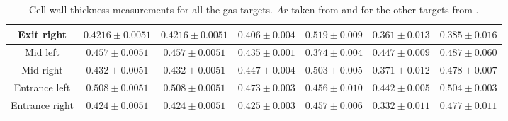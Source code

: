 \documentclass[final,5p,times,twocolumn]{elsarticle}
\begin{document}
\begin{table}[h!]
\begin{adjustbox}{width=1\textwidth}
\begin{tabular}{|c|c|c|c|c|c|c|}
Exit right              &      $0.4216 \pm 0.0051$                                                       & $0.4216 \pm 0.0051$                                                 & $0.406 \pm 0.004$                                                     & $0.519 \pm 0.009$                                                     & $0.361 \pm 0.013$                                                     & $0.385 \pm 0.016$                                                      \\ \hline
Mid left             &        $0.457 \pm 0.0051$                                                         & $0.457 \pm 0.0051$                                                  & $0.435 \pm 0.001$                                                     & $0.374 \pm 0.004$                                                     & $0.447 \pm 0.009$                                                     & $0.487 \pm 0.060$                                                      \\ \hline
Mid right             &       $0.432 \pm 0.0051$                                                         & $0.432 \pm 0.0051$                                                  & $0.447 \pm 0.004$                                                     & $0.503 \pm 0.005$                                                     & $0.371 \pm 0.012$                                                     & $0.478 \pm 0.007$                                                    \\ \hline
Entrance left      &         $0.508 \pm 0.0051$                                                          & $0.508 \pm 0.0051$                                                  & $0.473 \pm 0.003$                                                     & $0.456 \pm 0.010$                                                     & $0.442 \pm 0.005$                                                     & $0.504 \pm 0.003$                                                      \\ \hline
Entrance right     &		$0.424 \pm 0.0051$                            		 & $0.424 \pm 0.0051$                             & $0.425 \pm 0.003$                                & 
$0.457 \pm 0.006$                                & 
$0.332 \pm 0.011$                                & 
$0.477 \pm 0.011$                                 \\ \hline
\end{tabular}
\end{adjustbox}
\caption{Cell wall thickness measurements for all the gas targets. $Ar$ taken from \cite{ar_config} and for the other targets from \cite{cellconfig}.}
\label{tab:cell}
\end{table}
\end{document}
